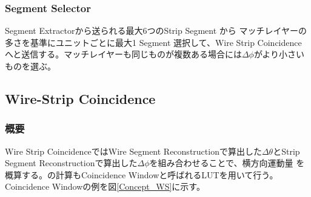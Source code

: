 \subsubsection*{Segment Selector}
Segment Extractorから送られる最大6つのStrip Segment から マッチレイヤーの多さを基準にユニットごとに最大1 Segment 選択して、Wire Strip Coincidence へと送信する。マッチレイヤーも同じものが複数ある場合には$\Delta\phi$がより小さいものを選ぶ。

\subsection{Wire-Strip Coincidence}
\subsubsection*{概要}
Wire Strip CoincidenceではWire Segment Reconstructionで算出した$\Delta\theta$とStrip Segment Reconstructionで算出した$\Delta\phi$を組み合わせることで、横方向運動量 \pt を概算する。\pt の計算もCoincidence Windowと呼ばれるLUTを用いて行う。Coincidence Windowの例を図\ref{Concept_WS}に示す。


